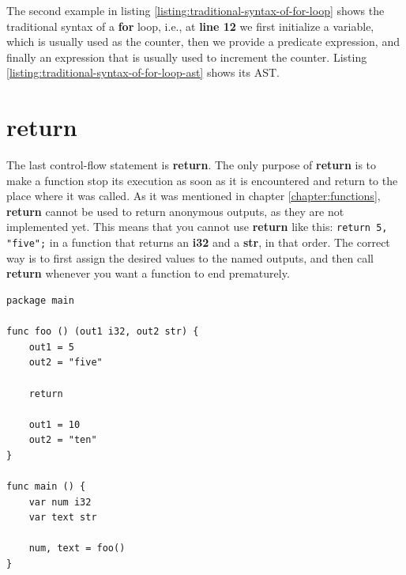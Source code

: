 \documentclass[11pt,fleqn,openany]{book} %
\begin{document}
The second example in listing \ref{listing:traditional-syntax-of-for-loop} shows the traditional syntax of a \textbf{for} loop, i.e., at \textbf{line 12} we first initialize a variable, which is usually used as the counter, then we provide a predicate expression, and finally an expression that is usually used to increment the counter. Listing \ref{listing:traditional-syntax-of-for-loop-ast} shows its AST.

\section{return}


The last control-flow statement is \textbf{return}. The only purpose of \textbf{return} is to make a function stop its execution as soon as it is encountered and return to the place where it was called. As it was mentioned in chapter \ref{chapter:functions}, \textbf{return} cannot be used to return anonymous outputs, as they are not implemented yet. This means that you cannot use \textbf{return} like this: \lstinline{return 5, "five";} in a function that returns an \textbf{i32} and a \textbf{str}, in that order. The correct way is to first assign the desired values to the named outputs, and then call \textbf{return} whenever you want a function to end prematurely.

\begin{lstlisting}[caption={Using the 'return' statement},captionpos=b,label={listing:usage-of-return}]
package main

func foo () (out1 i32, out2 str) {
	out1 = 5
    out2 = "five"
    
    return
    
    out1 = 10
    out2 = "ten"
}

func main () {
	var num i32
    var text str
    
    num, text = foo()
}
\end{lstlisting}
\end{document}
